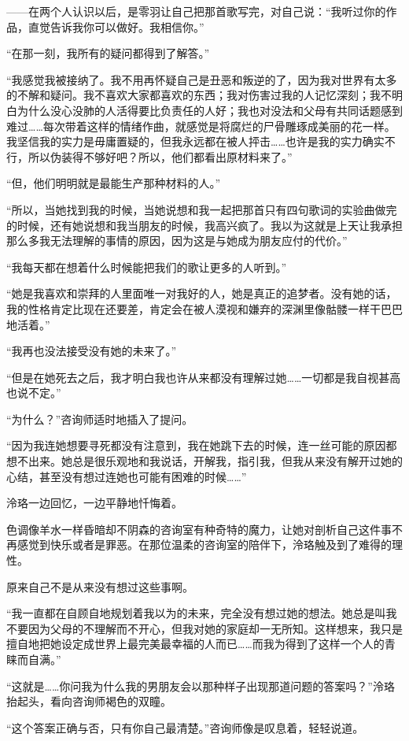 \documentclass[UTF8, scheme = chinese, openany]{ctexbook}
\begin{document}
——在两个人认识以后，是零羽让自己把那首歌写完，对自己说：“我听过你的作品，直觉告诉我你可以做好。我相信你。”

“在那一刻，我所有的疑问都得到了解答。”

“我感觉我被接纳了。我不用再怀疑自己是丑恶和叛逆的了，因为我对世界有太多的不解和疑问。我不喜欢大家都喜欢的东西；我对伤害过我的人记忆深刻；我不明白为什么没心没肺的人活得要比负责任的人好；我也对没法和父母有共同话题感到难过……每次带着这样的情绪作曲，就感觉是将腐烂的尸骨雕琢成美丽的花一样。我坚信我的实力是毋庸置疑的，但我永远都在被人抨击……也许是我的实力确实不行，所以伪装得不够好吧？所以，他们都看出原材料来了。”

“但，他们明明就是最能生产那种材料的人。”

“所以，当她找到我的时候，当她说想和我一起把那首只有四句歌词的实验曲做完的时候，还有她说想和我当朋友的时候，我高兴疯了。我以为这就是上天让我承担那么多我无法理解的事情的原因，因为这是与她成为朋友应付的代价。”

“我每天都在想着什么时候能把我们的歌让更多的人听到。”

“她是我喜欢和崇拜的人里面唯一对我好的人，她是真正的追梦者。没有她的话，我的性格肯定比现在还要差，肯定会在被人漠视和嫌弃的深渊里像骷髅一样干巴巴地活着。”

“我再也没法接受没有她的未来了。”

“但是在她死去之后，我才明白我也许从来都没有理解过她……一切都是我自视甚高也说不定。”

“为什么？”咨询师适时地插入了提问。

“因为我连她想要寻死都没有注意到，我在她跳下去的时候，连一丝可能的原因都想不出来。她总是很乐观地和我说话，开解我，指引我，但我从来没有解开过她的心结，甚至没有想过连她也可能有困难的时候……”

泠珞一边回忆，一边平静地忏悔着。

色调像羊水一样昏暗却不阴森的咨询室有种奇特的魔力，让她对剖析自己这件事不再感觉到快乐或者是罪恶。在那位温柔的咨询室的陪伴下，泠珞触及到了难得的理性。

原来自己不是从来没有想过这些事啊。

“我一直都在自顾自地规划着我以为的未来，完全没有想过她的想法。她总是叫我不要因为父母的不理解而不开心，但我对她的家庭却一无所知。这样想来，我只是擅自地把她设定成世界上最完美最幸福的人而已……而我为得到了这样一个人的青睐而自满。”

“这就是……你问我为什么我的男朋友会以那种样子出现那道问题的答案吗？”泠珞抬起头，看向咨询师褐色的双瞳。

“这个答案正确与否，只有你自己最清楚。”咨询师像是叹息着，轻轻说道。
\end{document}
